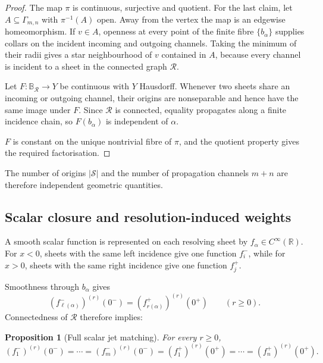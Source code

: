 \documentclass[11pt]{article}
\theoremstyle{plain}
\newtheorem{proposition}[theorem]{Proposition}
\theoremstyle{definition}
\begin{document}
\begin{proof}
The map \(\pi\) is continuous, surjective and quotient. For the last claim,
let \(A\subseteq\Gamma_{m,n}\) with \(\pi^{-1}(A)\) open. Away from the vertex
the map is an edgewise homeomorphism. If \(v\in A\), openness at every point
of the finite fibre \(\{b_\alpha\}\) supplies collars on the incident incoming
and outgoing channels. Taking the minimum of their radii gives a star
neighbourhood of \(v\) contained in \(A\), because every channel is incident
to a sheet in the connected graph \(\mathcal R\).

Let \(F:\mathbb B_{\mathcal R}\longrightarrow Y\) be continuous with \(Y\) Hausdorff. Whenever two sheets share an incoming
or outgoing channel, their origins are nonseparable and hence have the same
image under \(F\). Since \(\mathcal R\) is connected, equality propagates
along a finite incidence chain, so \(F(b_\alpha)\) is independent of \(\alpha\).

\(F\) is constant on the unique nontrivial fibre of \(\pi\), and the
quotient property gives the required factorisation.
\end{proof}

The number of origins \(|\mathcal S|\) and the number of propagation channels \(m+n\) are therefore independent geometric quantities.

\subsection{Scalar closure and resolution-induced weights}
\label{subsec:Bmn-scalar-core}
\label{subsec:Bmn-weight-matrix}
\label{subsec:Bmn-matrix-loss}
\label{subsec:Bmn-information-loss}

A smooth scalar function is represented on each resolving sheet by
\(f_\alpha\in C^\infty(\mathbb R)\).
For \(x<0\), sheets with the same left incidence give one function
\(f_i^-\),
while for \(x>0\), sheets with the same right incidence give one function
\(f_j^+\).

Smoothness through \(b_\alpha\) gives
\[
  (f_{\ell(\alpha)}^-)^{(r)}(0^-)
  =
  (f_{r(\alpha)}^+)^{(r)}(0^+)
  \qquad
  (r\geq0).
\]
Connectedness of \(\mathcal R\) therefore implies:

\begin{proposition}[Full scalar jet matching]
\label{prop:Bmn-full-jet-matching}
For every \(r\geq0\),
\[
  (f_1^-)^{(r)}(0^-)
  =
  \cdots
  =
  (f_m^-)^{(r)}(0^-)
  =
  (f_1^+)^{(r)}(0^+)
  =
  \cdots
  =
  (f_n^+)^{(r)}(0^+).
\]
\end{proposition}
\end{document}
